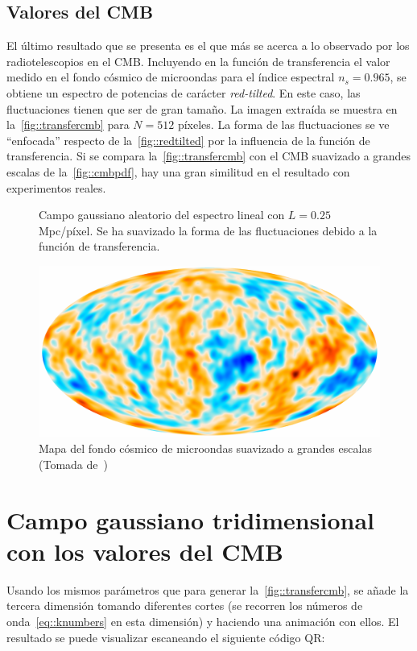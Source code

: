 \subsection{Valores del CMB}
El último resultado que se presenta es el que más se acerca a lo observado por los radiotelescopios en el CMB. Incluyendo en la función de transferencia el valor medido en el fondo cósmico de microondas para el índice espectral \(n_s=0.965\), se obtiene un espectro de potencias de carácter \textit{red-tilted}. En este caso, las fluctuaciones tienen que ser de gran tamaño. La imagen extraída se muestra en la~\autoref{fig::transfercmb} para \(N=512\) píxeles. La forma de las fluctuaciones se ve ``enfocada'' respecto de la~\autoref{fig::redtilted} por la influencia de la función de transferencia. Si se compara la~\autoref{fig::transfercmb} con el CMB suavizado a grandes escalas de la~\autoref{fig::cmbpdf}, hay una gran similitud en el resultado con experimentos reales.
\begin{figure}[ht]
    \centering
    \scalebox{.85}{}
    \caption[Valores del CMB \(N=512\) píxeles y \(L=0.25\) Mpc/píxel]{Campo gaussiano aleatorio del espectro lineal con \(L=0.25\) Mpc/píxel. Se ha suavizado la forma de las fluctuaciones debido a la función de transferencia.}
    \label{fig::transfercmb}
\end{figure}
\begin{figure}[t]
    \centering
    \includegraphics[scale=.6]{img/Planck_2018_Pol_CMB.pdf}
    \caption[Mapa del fondo cósmico de microondas a grandes escalas]{Mapa del fondo cósmico de microondas suavizado a grandes escalas (Tomada de~\cite{collaboration2020planck4})}
    \label{fig::cmbpdf}
\end{figure}
\section{Campo gaussiano tridimensional con los valores del CMB}
Usando los mismos parámetros que para generar la~\autoref{fig::transfercmb}, se añade la tercera dimensión tomando diferentes cortes (se recorren los números de onda~\eqref{eq::knumbers} en esta dimensión) y haciendo una animación con ellos. El resultado se puede visualizar escaneando el siguiente código QR:
\begin{center}
    {\hypersetup{urlcolor=.}\textcolor{qrblue}{}}
\end{center}